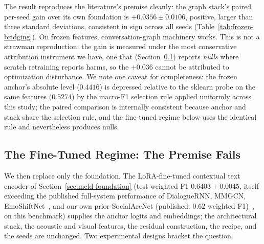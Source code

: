 The result reproduces the literature's premise cleanly: the graph stack's paired per-seed gain over its own foundation is $\mathbf{+0.0356 \pm 0.0106}$, positive, larger than three standard deviations, consistent in sign across all seeds (Table~\ref{tab:frozen-bridging}). On frozen features, conversation-graph machinery works. This is not a strawman reproduction: the gain is measured under the most conservative attribution instrument we have, one that (Section~\ref{sec:meld-finetuned}) reports \textit{nulls} where scratch retraining reports harms, so the $+0.036$ cannot be attributed to optimization disturbance. We note one caveat for completeness: the frozen anchor's absolute level ($0.4416$) is depressed relative to the sklearn probe on the same features ($0.5274$) by the macro-F1 selection rule applied uniformly across this study; the paired comparison is internally consistent because anchor and stack share the selection rule, and the fine-tuned regime below uses the identical rule and nevertheless produces nulls.



\subsection{The Fine-Tuned Regime: The Premise Fails}
\label{sec:meld-finetuned}

We then replace only the foundation. The LoRA-fine-tuned contextual text encoder of Section~\ref{sec:meld-foundation} (test weighted F1 $0.6403 \pm 0.0045$, itself exceeding the published full-system performance of DialogueRNN, MMGCN, EmoShiftNet~\cite{dialoguernn2019,mmgcn2021,emoshiftnet2025}, and our own prior SocialArcNet (published: $0.62$ weighted F1)~\cite{socialarcnet2026}, on this benchmark) supplies the anchor logits and embeddings; the architectural stack, the acoustic and visual features, the residual construction, the recipe, and the seeds are unchanged. Two experimental designs bracket the question.

